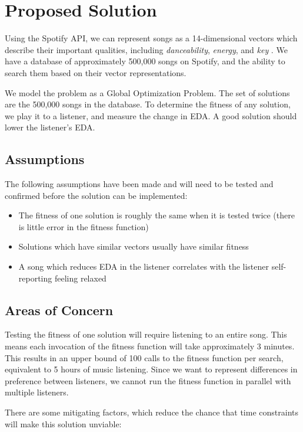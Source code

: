\documentclass{article}
\begin{document}
	\section{Proposed Solution}
	Using the Spotify API, we can represent songs as a 14-dimensional vectors which describe their important qualities, including \emph{danceability}, \emph{energy}, and \emph{key} \cite{spotify_get_nodate, jehan_analyzer_nodate}. We have a database of approximately 500,000 songs on Spotify, and the ability to search them based on their vector representations.
	
	We model the problem as a Global Optimization Problem. The set of solutions are the 500,000 songs in the database. To determine the fitness of any solution, we play it to a listener, and measure the change in EDA. A good solution should lower the listener's EDA.
	
	\subsection{Assumptions}
	The following assumptions have been made and will need to be tested and confirmed before the solution can be implemented:
	
	\begin{itemize}
		\item The fitness of one solution is roughly the same when it is tested twice (there is little error in the fitness function)
		\item Solutions which have similar vectors usually have similar fitness
		\item A song which reduces EDA in the listener correlates with the listener self-reporting feeling relaxed
	\end{itemize}

	\subsection{Areas of Concern}
	Testing the fitness of one solution will require listening to an entire song. This means each invocation of the fitness function will take approximately 3 minutes. This results in an upper bound of 100 calls to  the fitness function per search, equivalent to 5 hours of music listening. Since we want to represent differences in preference between listeners, we cannot run the fitness function in parallel with multiple listeners.

	There are some mitigating factors, which reduce the chance that time constraints will make this solution unviable:
	
\end{document}

